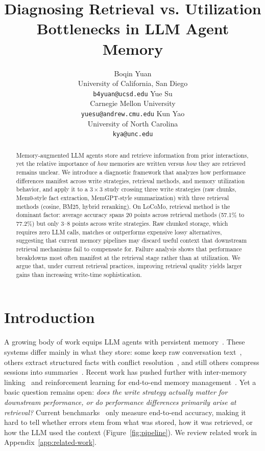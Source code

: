 \documentclass{article} %
\title{Diagnosing Retrieval vs. Utilization Bottlenecks in LLM Agent Memory}
\author{
Boqin Yuan \\
University of California, San Diego \\
\texttt{b4yuan@ucsd.edu}
\And
Yue Su \\
Carnegie Mellon University \\
\texttt{yuesu@andrew.cmu.edu}
\And
Kun Yao \\
University of North Carolina \\
\texttt{kya@unc.edu}
}
\begin{document}
\maketitle

\begin{abstract}
Memory-augmented LLM agents store and retrieve information from prior interactions, yet the relative importance of \emph{how} memories are written versus \emph{how} they are retrieved remains unclear. We introduce a diagnostic framework that analyzes how performance differences manifest across write strategies, retrieval methods, and memory utilization behavior, and apply it to a $3 \times 3$ study crossing three write strategies (raw chunks, Mem0-style fact extraction, MemGPT-style summarization) with three retrieval methods (cosine, BM25, hybrid reranking). On LoCoMo, retrieval method is the dominant factor: average accuracy spans 20 points across retrieval methods (57.1\% to 77.2\%) but only 3--8 points across write strategies. Raw chunked storage, which requires zero LLM calls, matches or outperforms expensive lossy alternatives, suggesting that current memory pipelines may discard useful context that downstream retrieval mechanisms fail to compensate for. Failure analysis shows that performance breakdowns most often manifest at the retrieval stage rather than at utilization. We argue that, under current retrieval practices, improving retrieval quality yields larger gains than increasing write-time sophistication.
\end{abstract}

\section{Introduction}
A growing body of work equips LLM agents with persistent memory~\citep{packer2023memgpt, xu2025amem, chhikara2025mem0}. These systems differ mainly in what they store: some keep raw conversation text~\citep{lewis2020rag}, others extract structured facts with conflict resolution~\citep{chhikara2025mem0, xu2025amem}, and still others compress sessions into summaries~\citep{packer2023memgpt}. Recent work has pushed further with inter-memory linking~\citep{xu2025amem} and reinforcement learning for end-to-end memory management~\citep{zhou2025mem1learningsynergizememory, wang2025memalphalearningmemoryconstruction}. Yet a basic question remains open: \emph{does the write strategy actually matter for downstream performance, or do performance differences primarily arise at retrieval?} Current benchmarks~\citep{maharana2024locomo, wu2025longmemeval} only measure end-to-end accuracy, making it hard to tell whether errors stem from what was stored, how it was retrieved, or how the LLM used the context (Figure~\ref{fig:pipeline}). We review related work in Appendix~\ref{app:related-work}.
\end{document}

